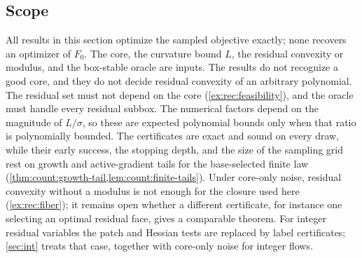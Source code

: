 \subsection{Scope}\label{sec:rec:scope}

All results in this section optimize the sampled objective exactly; none
recovers an optimizer of $F_0$. The core, the curvature bound $L$, the
residual convexity or modulus, and the box-stable oracle are inputs. The
results do not recognize a good core, and they do not decide residual
convexity of an arbitrary polynomial. The residual set must not depend on
the core (\cref{ex:rec:feasibility}), and the oracle must handle every
residual subbox. The numerical factors depend on the magnitude of
$L/\sigma$, so these are expected polynomial bounds only when that ratio
is polynomially bounded. The certificates are exact and sound on every draw,
while their early success, the stopping depth, and the size of the sampling
grid rest on growth and active-gradient tails for the base-selected finite
law (\cref{thm:count:growth-tail,lem:count:finite-tails}). Under core-only noise,
residual convexity without a modulus is not enough for the closure used here
(\cref{ex:rec:fiber}); it remains open whether a different certificate,
for instance one selecting an optimal residual face, gives a comparable
theorem. For integer residual variables the patch and Hessian tests are
replaced by label certificates; \cref{sec:int} treats that case, together
with core-only noise for integer flows.
